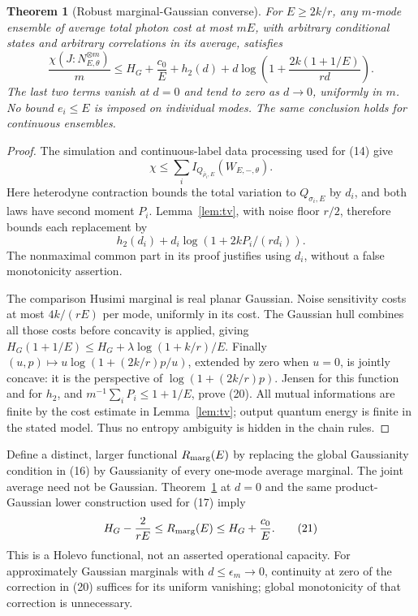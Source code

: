 \documentclass[11pt]{article}
\newtheorem{theorem}{Theorem}
\begin{document}
\begin{theorem}[Robust marginal-Gaussian converse]\label{thm:robust}
For \(E\geq2k/r\), any \(m\)-mode ensemble of average total photon
cost at most \(mE\), with arbitrary conditional states and arbitrary
correlations in its average, satisfies
\[
 \frac{\chi(J:N_{E,\theta}^{\otimes m})}{m}
 \leq H_G+\frac{c_0}{E}+h_2(d)
       +d\log\left(1+\frac{2k(1+1/E)}{rd}\right).          \tag{20}
\]
The last two terms vanish at \(d=0\) and tend to zero as \(d\to0\),
uniformly in \(m\). No bound \(e_i\leq E\) is imposed on individual
modes. The same conclusion holds for continuous ensembles.
\end{theorem}
\begin{proof}
The simulation and continuous-label data processing used for (14) give
\[
 \chi\leq\sum_i I_{Q_{\bar\rho_i,E}}(W_{E,-,\theta}).
\]
Here heterodyne contraction bounds the total variation to
\(Q_{\sigma_i,E}\) by \(d_i\), and both laws have second moment \(P_i\).
Lemma~\ref{lem:tv}, with noise floor \(r/2\), therefore bounds each
replacement by
\[
 h_2(d_i)+d_i\log(1+2kP_i/(rd_i)).
\]
The nonmaximal common part in its proof justifies using \(d_i\),
without a false monotonicity assertion.

The comparison Husimi marginal is real planar Gaussian. Noise sensitivity
costs at most \(4k/(rE)\) per mode, uniformly in its cost. The Gaussian
hull combines all those costs before concavity is applied, giving
\(H_G(1+1/E)\leq H_G+\lambda\log(1+k/r)/E\).
Finally \((u,p)\mapsto u\log(1+(2k/r)p/u)\), extended by zero
when \(u=0\), is jointly concave: it is the perspective of
\(\log(1+(2k/r)p)\). Jensen for this function and for \(h_2\), and
\(m^{-1}\sum_iP_i\leq1+1/E\), prove (20). All mutual informations
are finite by the cost estimate in Lemma~\ref{lem:tv}; output quantum
energy is finite in the stated model. Thus no entropy ambiguity is
hidden in the chain rules.
\end{proof}

Define a distinct, larger functional \(R_{\rm marg}(E)\) by replacing
the global Gaussianity condition in (16) by Gaussianity of every
one-mode average marginal. The joint average need not be Gaussian.
Theorem~\ref{thm:robust} at \(d=0\) and the same product-Gaussian
lower construction used for (17) imply
\[
 H_G-\frac2{rE}\leq R_{\rm marg}(E)
 \leq H_G+\frac{c_0}{E}.                                  \tag{21}
\]
This is a Holevo functional, not an asserted operational capacity.
For approximately Gaussian marginals with \(d\leq\epsilon_m\to0\),
continuity at zero of the correction in (20) suffices for its uniform
vanishing; global monotonicity of that correction is unnecessary.
\end{document}
